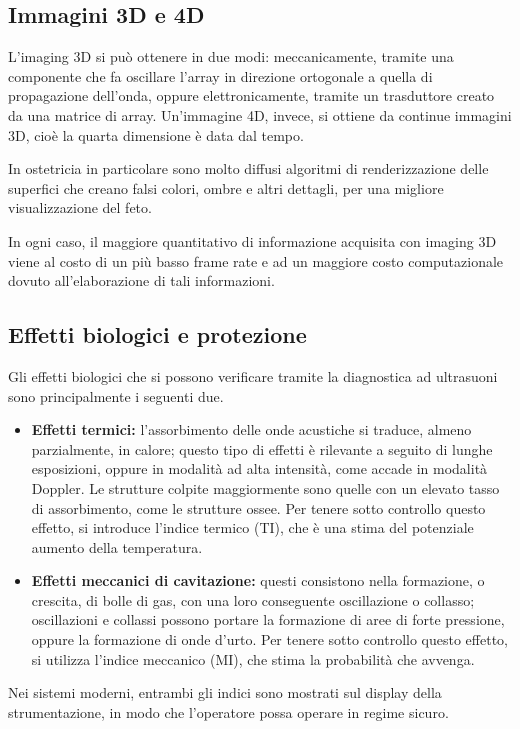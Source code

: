 \documentclass[11pt, a4paper]{scrartcl}
\theoremstyle{style}
\theoremstyle{style1}
\numberwithin{equation}{subsection}
\begin{document}
\subsection{Immagini 3D e 4D}

L'imaging 3D si pu\`o ottenere in due modi: meccanicamente, tramite una componente che fa oscillare l'array in direzione ortogonale a quella di propagazione dell'onda, oppure elettronicamente, tramite un trasduttore creato da una matrice di array.
Un'immagine 4D, invece, si ottiene da continue immagini 3D, cio\`e la quarta dimensione \`e data dal tempo.

In ostetricia in particolare sono molto diffusi algoritmi di renderizzazione delle superfici che creano falsi colori, ombre e altri dettagli, per una migliore visualizzazione del feto.

In ogni caso, il maggiore quantitativo di informazione acquisita con imaging 3D viene al costo di un pi\`u basso frame rate e ad un maggiore costo computazionale dovuto all'elaborazione di tali informazioni.

\subsection{Effetti biologici e protezione}

Gli effetti biologici che si possono verificare tramite la diagnostica ad ultrasuoni sono principalmente i seguenti due.
\begin{itemize}
	\item \textbf{Effetti termici:} l'assorbimento delle onde acustiche si traduce, almeno parzialmente, in calore; questo tipo di effetti \`e rilevante a seguito di lunghe esposizioni, oppure in modalit\`a ad alta intensit\`a, come accade in modalit\`a Doppler.
		Le strutture colpite maggiormente sono quelle con un elevato tasso di assorbimento, come le strutture ossee.
		Per tenere sotto controllo questo effetto, si introduce l'indice termico (TI), che \`e una stima del potenziale aumento della temperatura.
	\item \textbf{Effetti meccanici di cavitazione:} questi consistono nella formazione, o crescita, di bolle di gas, con una loro conseguente oscillazione o collasso; oscillazioni e collassi possono portare la formazione di aree di forte pressione, oppure la formazione di onde d'urto.
		Per tenere sotto controllo questo effetto, si utilizza l'indice meccanico (MI), che stima la probabilit\`a che avvenga.
\end{itemize}
Nei sistemi moderni, entrambi gli indici sono mostrati sul display della strumentazione, in modo che l'operatore possa operare in regime sicuro.
\end{document}

